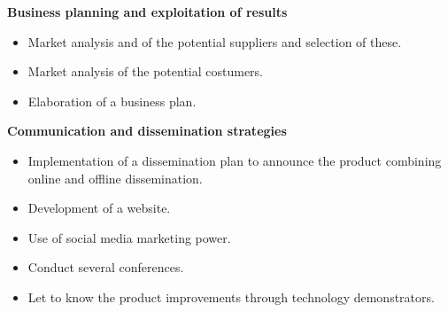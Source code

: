 {\bfseries Business planning and exploitation of results}
\begin{itemize}
	\item Market analysis and of the potential suppliers and selection of these.
	\item Market analysis of the potential costumers.
	\item Elaboration of a business plan. 

\end{itemize}


\textbf{Communication and dissemination strategies}
\begin{itemize}
	\item Implementation of a dissemination plan to announce the product combining online and offline dissemination.	
	 \item Development of 
	  a website. 
	  \item Use of social media marketing power. 
	  \item Conduct several conferences.
	  \item Let to know the product improvements through technology demonstrators.
\end{itemize}




